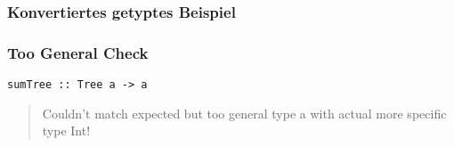 \begin{frame}[fragile]
\frametitle{ Konvertiertes getyptes Beispiel}

\end{frame}

\begin{frame}[fragile]
  \frametitle{Too General Check}
  \begin{lstlisting}
sumTree :: Tree a -> a
  \end{lstlisting}
  \begin{quote}
    Couldn't match expected but too general type \grqq{}a\grqq{} with actual more specific type \grqq{}Int\grqq{}!
  \end{quote}
\end{frame}

